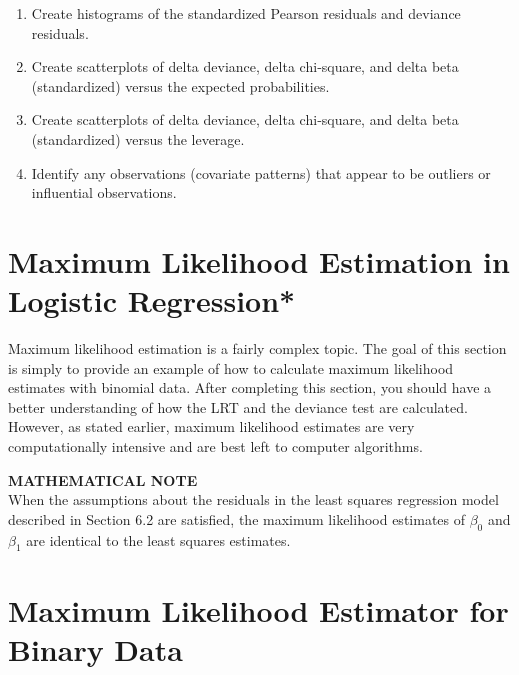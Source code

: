 \documentclass[
]{report}
\providecommand{\tightlist}{%
  \setlength{\itemsep}{0pt}\setlength{\parskip}{0pt}}
\begin{document}
\begin{enumerate}
\def\labelenumi{\alph{enumi}.}
\tightlist
\item
  Create histograms of the standardized Pearson residuals and deviance residuals.\\
\item
  Create scatterplots of delta deviance, delta chi‐square, and delta beta (standardized) versus the expected probabilities.\\
\item
  Create scatterplots of delta deviance, delta chi‐square, and delta beta (standardized) versus the leverage.\\
\item
  Identify any observations (covariate patterns) that appear to be outliers or influential observations.
\end{enumerate}

\hypertarget{maximum-likelihood-estimation-in-logistic-regression}{%
\section{\texorpdfstring{\textbf{Maximum Likelihood Estimation in Logistic Regression}*}{Maximum Likelihood Estimation in Logistic Regression*}}\label{maximum-likelihood-estimation-in-logistic-regression}}

Maximum likelihood estimation is a fairly complex topic. The goal of this section is simply to provide an example of how to calculate maximum likelihood estimates with binomial data. After completing this section, you should have a better understanding of how the LRT and the deviance test are calculated. However, as stated earlier, maximum likelihood estimates are very computationally intensive and are best left to computer algorithms.

\large

\textbf{MATHEMATICAL NOTE}\\
When the assumptions about the residuals in the least squares regression model described in Section 6.2 are satisfied, the maximum likelihood estimates of \(\beta_0\) and \(\beta_1\) are identical to the least squares estimates.\\
\normalsize

\hypertarget{maximum-likelihood-estimator-for-binary-data}{%
\section*{Maximum Likelihood Estimator for Binary Data}\label{maximum-likelihood-estimator-for-binary-data}}
\end{document}
